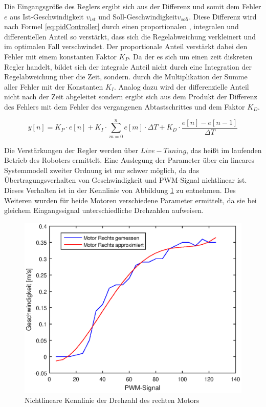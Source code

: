 \documentclass[12pt,a4paper,oneside]{article}
\begin{document}
\begin{spacing}{1.15}
Die Eingangsgröße des Reglers ergibt sich aus der Differenz und somit dem Fehler $e$ aus Ist-Geschwindigkeit $v_{ist}$ und Soll-Geschwindigkeit$v_{soll}$. Diese Differenz wird nach Formel \ref{eq:pidController} durch einen proportionalen , integralen und differentiellen Anteil so verstärkt, dass sich die Regelabweichung verkleinert und im optimalen Fall verschwindet. Der proportionale Anteil verstärkt dabei den Fehler mit einem konstanten Faktor $K_{P}$. Da der es sich um einen zeit diskreten Regler handelt, bildet sich der integrale Anteil nicht durch eine Integration der Regelabweichung über die Zeit, sondern. durch die Multiplikation der Summe aller Fehler mit der Konstanten $K_{I}$. Analog dazu wird der differenzielle Anteil nicht nach der Zeit abgeleitet sondern ergibt sich aus dem Produkt der Differenz des Fehlers mit dem Fehler des vergangenen Abtastschrittes und dem Faktor $K_{D}$. 

\begin{center}
	\begin{equation}
	y[n] =  K_{P}\cdot e[n] + K_{I} \cdot \sum\limits_{m=0}^n e[m] \cdot \Delta T+ K_{D} \cdot \frac{e[n] - e[n-1]}{\Delta T}
	\label{eq:pidController}
	\end{equation}
\end{center} 

Die Verstärkungen der Regler werden über $Live-Tuning$, das heißt im laufenden Betrieb des Roboters ermittelt. Eine Auslegung der Parameter über ein lineares Systemmodell zweiter Ordnung ist nur schwer möglich, da das Übertragungsverhalten von Geschwindigkeit und PWM-Signal nichtlinear ist. Dieses Verhalten ist in der Kennlinie von Abbildung \ref{fig:nl_kennlinie_R} zu entnehmen.
Des Weiteren wurden für beide Motoren verschiedene Parameter ermittelt, da sie bei gleichem Eingangssignal unterschiedliche Drehzahlen aufweisen. 

\begin{figure}[!htb]
	\centering
	\includegraphics[scale=.7]{figs/Motor_Rechts_Kennlinie.eps}
	\caption{Nichtlineare Kennlinie der Drehzahl des rechten Motors}
	\label{fig:nl_kennlinie_R}
\end{figure}


\end{spacing}
\end{document}
